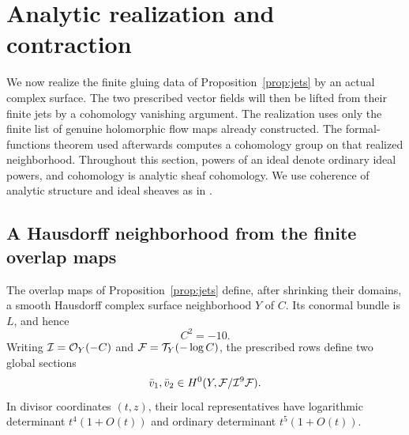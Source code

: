 \section{Analytic realization and contraction}
\label{analytic:section}

We now realize the finite gluing data of Proposition~\ref{prop:jets} by
an actual complex surface.  The two prescribed vector fields will then
be lifted from their finite jets by a cohomology vanishing argument.
The realization uses only the finite list of genuine holomorphic flow
maps already constructed. The formal-functions theorem used afterwards
computes a cohomology group on that realized neighborhood.
Throughout this section, powers of an ideal denote ordinary ideal
powers, and cohomology is analytic sheaf cohomology. We use coherence
of analytic structure and ideal sheaves as in
\cite[Chapter~II, Theorems~3.19 and~4.29]{Demailly2012}.

\subsection{A Hausdorff neighborhood from the finite overlap maps}

\begin{lemma}\label{analytic:realization}
The overlap maps of Proposition~\ref{prop:jets} define, after shrinking
their domains, a smooth Hausdorff complex surface neighborhood $Y$ of
$C$.  Its conormal bundle is $L$, and hence
\[
 C^2=-10.
\]
Writing $\mathcal I=\mathcal O_Y(-C)$ and $\mathcal F=\mathcal T_Y(-\log C)$, the prescribed rows
define two global sections
\[
 \bar v_1,\bar v_2\in H^0(Y,\mathcal F/\mathcal I^9\mathcal F).
\]
In divisor coordinates $(t,z)$, their local representatives have
logarithmic determinant $t^4(1+O(t))$ and ordinary determinant
$t^5(1+O(t))$.
\end{lemma}

